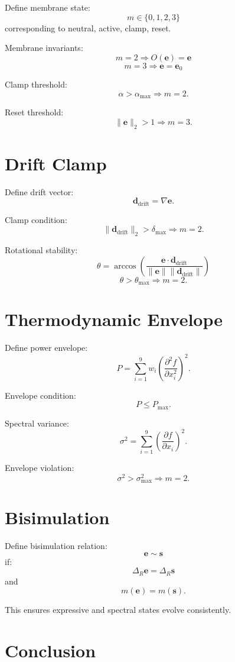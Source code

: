 \documentclass[11pt]{article}
\begin{document}
Define membrane state:
\[
m \in \{0,1,2,3\}
\]
corresponding to neutral, active, clamp, reset.

Membrane invariants:
\[
m = 2 \Rightarrow O(\bm{e}) = \bm{e}
\]
\[
m = 3 \Rightarrow \bm{e} = \bm{e}_0
\]

Clamp threshold:
\[
\alpha > \alpha_{\max} \Rightarrow m = 2.
\]

Reset threshold:
\[
\|\bm{e}\|_2 > 1 \Rightarrow m = 3.
\]

\section{Drift Clamp}

Define drift vector:
\[
\bm{d}_{\text{drift}} = \nabla \bm{e}.
\]

Clamp condition:
\[
\|\bm{d}_{\text{drift}}\|_2 > \delta_{\max} \Rightarrow m = 2.
\]

Rotational stability:
\[
\theta = \arccos\left( \frac{\bm{e} \cdot \bm{d}_{\text{drift}}}{\|\bm{e}\|\|\bm{d}_{\text{drift}}\|} \right)
\]
\[
\theta > \theta_{\max} \Rightarrow m = 2.
\]

\section{Thermodynamic Envelope}

Define power envelope:
\[
P = \sum_{i=1}^9 w_i \left( \frac{\partial^2 f}{\partial x_i^2} \right)^2.
\]

Envelope condition:
\[
P \leq P_{\max}.
\]

Spectral variance:
\[
\sigma^2 = \sum_{i=1}^9 \left( \frac{\partial f}{\partial x_i} \right)^2.
\]

Envelope violation:
\[
\sigma^2 > \sigma_{\max}^2 \Rightarrow m = 2.
\]

\section{Bisimulation}

Define bisimulation relation:
\[
\bm{e} \sim \bm{s}
\]
if:
\[
\Delta_R \bm{e} = \Delta_R \bm{s}
\]
and
\[
m(\bm{e}) = m(\bm{s}).
\]

This ensures expressive and spectral states evolve consistently.

\section{Conclusion}
\end{document}
